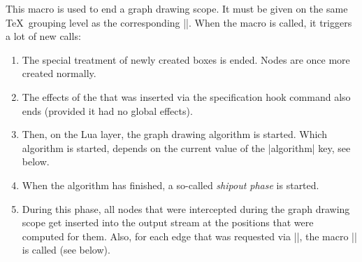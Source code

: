 \begin{command}{\pgfgdendscope}
  This macro is used to end a graph drawing scope. It must be given on
  the same \TeX\ grouping level as the corresponding
  |\pgfgdbeginscope|. When the macro is called, it triggers a lot of
  new calls:
  \begin{enumerate}
  \item The special treatment of newly created boxes is ended. Nodes
    are once more created normally.
  \item The effects of the  that was inserted via the
    specification hook command also ends (provided it had no global
    effects).
  \item Then, on the Lua layer, the graph drawing algorithm is
    started. Which algorithm is started, depends on the current value
    of the |algorithm| key, see below.
  \item When the algorithm has finished, a so-called \emph{shipout
      phase} is started.
  \item During this phase, all nodes that were intercepted during the
    graph drawing scope get inserted into the output stream at the
    positions that were computed for them. Also, for each edge that
    was requested via |\pgfgdedge|, the macro |\pgfgdedgecallback| is
    called (see below).


\end{enumerate}
\end{command}
